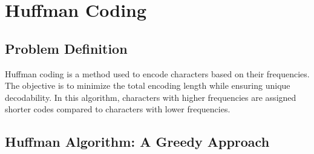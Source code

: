 \documentclass[12pt]{book} %
\begin{document}
\section{Huffman Coding}
\subsection{Problem Definition}
Huffman coding is a method used to encode characters based on their frequencies. The objective is to minimize the total encoding length while ensuring unique decodability. In this algorithm, characters with higher frequencies are assigned shorter codes compared to characters with lower frequencies. 


\subsection{Huffman Algorithm: A Greedy Approach}
\end{document}
